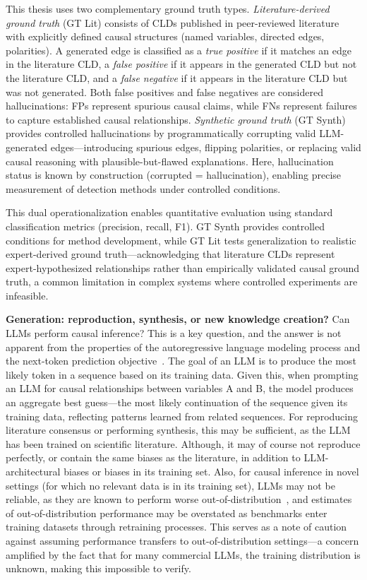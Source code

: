 This thesis uses two complementary ground truth types. \emph{Literature-derived ground truth} (GT Lit) consists of CLDs published in peer-reviewed literature with explicitly defined causal structures (named variables, directed edges, polarities). A generated edge is classified as a \emph{true positive} if it matches an edge in the literature CLD, a \emph{false positive} if it appears in the generated CLD but not the literature CLD, and a \emph{false negative} if it appears in the literature CLD but was not generated. Both false positives and false negatives are considered hallucinations: FPs represent spurious causal claims, while FNs represent failures to capture established causal relationships. \emph{Synthetic ground truth} (GT Synth) provides controlled hallucinations by programmatically corrupting valid LLM-generated edges---introducing spurious edges, flipping polarities, or replacing valid causal reasoning with plausible-but-flawed explanations. Here, hallucination status is known by construction (corrupted = hallucination), enabling precise measurement of detection methods under controlled conditions.

This dual operationalization enables quantitative evaluation using standard classification metrics (precision, recall, F1). GT Synth provides controlled conditions for method development, while GT Lit tests generalization to realistic expert-derived ground truth---acknowledging that literature CLDs represent expert-hypothesized relationships rather than empirically validated causal ground truth, a common limitation in complex systems where controlled experiments are infeasible.

\medskip
\noindent
\textbf{Generation: reproduction, synthesis, or new knowledge creation?} Can LLMs perform causal inference? This is a key question, and the answer is not apparent from the properties of the autoregressive language modeling process and the next-token prediction objective~\citep{zecevic2023causalparrots}. The goal of an LLM is to produce the most likely token in a sequence based on its training data. Given this, when prompting an LLM for causal relationships between variables A and B, the model produces an aggregate best guess---the most likely continuation of the sequence given its training data, reflecting patterns learned from related sequences. For reproducing literature consensus or performing synthesis, this may be sufficient, as the LLM has been trained on scientific literature. Although, it may of course not reproduce perfectly, or contain the same biases as the literature, in addition to LLM-architectural biases or biases in its training set. Also, for causal inference in novel settings (for which no relevant data is in its training set), LLMs may not be reliable, as they are known to perform worse out-of-distribution~\citep{jin2023cladder, joshi2024causalfallacies}, and estimates of out-of-distribution performance may be overstated as benchmarks enter training datasets through retraining processes. This serves as a note of caution against assuming performance transfers to out-of-distribution settings---a concern amplified by the fact that for many commercial LLMs, the training distribution is unknown, making this impossible to verify.


